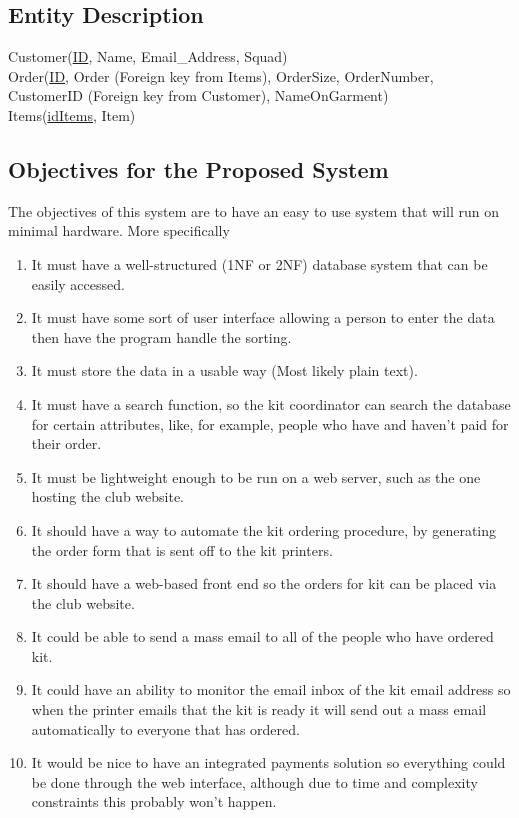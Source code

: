 \documentclass[
11pt, %
a4paper, %
oneside, %
headinclude,footinclude, %
BCOR5mm, %
]{scrartcl}
\begin{document}
\subsection{Entity Description}

Customer(\uline{ID}, Name, Email\_Address, Squad)\\
Order(\uline{ID}, Order (Foreign key from Items), OrderSize, OrderNumber, CustomerID (Foreign key from Customer), NameOnGarment)\\
Items(\uline{idItems}, Item)

\subsection{Objectives for the Proposed System}
The objectives of this system are to have an easy to use system that will run on minimal hardware. More specifically  \begin{enumerate}
	\item It must have a well-structured (1NF or 2NF) database system that can be easily accessed.
	\item It must have some sort of user interface allowing a person to enter the data then have the program handle the sorting.
	\item It must store the data in a usable way (Most likely plain text).
	\item It must have a search function, so the kit coordinator can search the database for certain attributes, like, for example, people who have and haven't paid for their order.
	\item It must be lightweight enough to be run on a web server, such as the one hosting the club website.
	\item It should have a way to automate the kit ordering procedure, by generating the order form that is sent off to the kit printers.
	\item It should have a web-based front end so the orders for kit can be placed via the club website.
	\item It could be able to send a mass email to all of the people who have ordered kit.
	\item It could have an ability to monitor the email inbox of the kit email address so when the printer emails that the kit is ready it will send out a mass email automatically to everyone that has ordered.
	\item It would be nice to have an integrated payments solution so everything could be done through the web interface, although due to time and complexity constraints this probably won't happen.
\end{enumerate}
\end{document}
